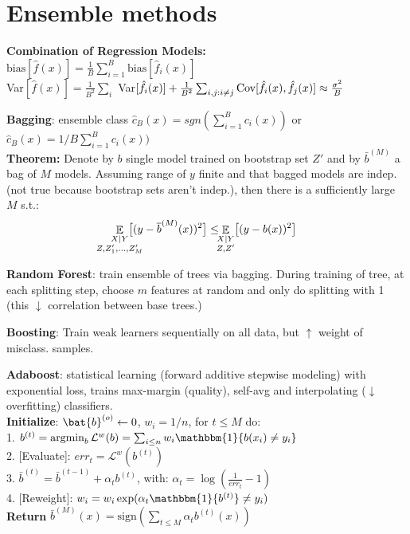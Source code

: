 \section{Ensemble methods}


\textbf{Combination of Regression Models:}\\
$\text{bias}[\hat{f}(x)] = \frac{1}{B} \sum_{i=1}^{B} \text{bias}[\hat{f}_i(x)]$\\
Var$[\hat{f}(x)] = \frac{1}{B^2}\sum_i$ Var$[\hat{f}_i(x)]
+ \frac{1}{B^2}\sum_{i,j:i\neq j} \operatorname{\textrm{Cov}}[\hat{f}_i(x), \hat{f}_j(x)] \approx \frac{\sigma^2}{B}$

\textbf{Bagging}:
ensemble class $\hat{c}_B(x)=sgn(\sum_{i=1}^{B} c_i(x))$ or $\hat{c}_B(x)=1/B\sum_{i=1}^{B} c_i(x))$\\

\textbf{Theorem:} Denote by $b$ single model trained on bootstrap set $Z'$ and by $\bar{b}^{(M)}$ a bag of $M$ models. Assuming range of $y$ finite and that bagged models are indep. (not true because bootstrap sets aren't indep.), then there is a sufficiently large $M$ s.t.:
$$
\mathop{\mathbb{E}}_{\mathclap{\substack{X|Y \\ Z, Z'_1, \ldots, Z'_M}}}\;
\big[ (y - \bar{b}^{(M)}(x))^2 \big]
\leq
\mathop{\mathbb{E}}_{\mathclap{\substack{X|Y \\ Z,Z'}}}\;
\big[ (y - b(x))^2 \big]
$$

\textbf{Random Forest}: train ensemble of trees via bagging. During training of tree, at each splitting step, choose $m$ features at random and only do splitting with 1 (this $\downarrow$ correlation between base trees.)

\textbf{Boosting}: Train weak learners sequentially on all data, but $\uparrow$ weight of misclass. samples.

\textbf{Adaboost}: statistical learning (forward additive stepwise modeling) with exponential loss, trains max-margin (quality), self-avg and interpolating ($\downarrow$ overfitting) classifiers.\\
\textbf{Initialize}: $\bat{b}^{(o)}\leftarrow 0$, $w_i = 1/n$, for $t\leq M$ do:\\
1. $b^{(t)}=\argmin_b \mathcal{L}^w(b)=\sum_{i\leq n}w_i\mathbbm{1}\{b(x_i)\neq y_i\}$\\
2. [Evaluate]: $err_t = \mathcal{L}^w(b^{(t)})$\\
3. $\bar b^{(t)}=\bar b^{(t-1)}+\alpha_t b^{(t)}$, with: $\alpha_t=\log(\frac{1}{err_t}-1)$\\
4. [Reweight]: $w_i = w_i \exp(\alpha_t \mathbbm{1}\{b^{(t)}\}\not = y_i)$\\
\textbf{Return} $\bar b^{(M)}(x) = \text{sign} \left ( \sum_{t\leq M} \alpha_t b^{(t)}(x) \right )$\\




